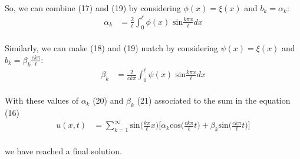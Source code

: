 \documentclass[letter]{article}
\begin{document}
    \paragraph{}So, we can combine (17) and (19) by considering $\phi(x)=\xi(x)$ and $b_k=\alpha_k$:
    \begin{equation}
        \begin{split}
            \alpha_k &= \frac{2}{\ell}\int_{0}^{\ell}\phi(x)\text{ sin}\frac{k\pi x}{\ell}dx
        \end{split}
    \end{equation}
    \paragraph{}Similarly, we can make (18) and (19) match by considering $\psi(x)=\xi(x)$ and $b_k=\beta_k\frac{ck\pi}{\ell}$:
    \begin{equation}
        \begin{split}
            \beta_k &= \frac{2}{ck\pi}\int_{0}^{\ell}\psi(x)\text{ sin}\frac{k\pi x}{\ell}dx
        \end{split}
    \end{equation}
    \paragraph{}With these values of $\alpha_k$ (20) and $\beta_k$ (21) associated to the sum in the equation (16) 
    \begin{equation*}
        \begin{split}
            u(x,t) &= 
            \sum_{k=1}^\infty\text{sin}\bigg(\frac{k\pi}{\ell}x\bigg)\bigg[\alpha_k\text{cos}\bigg(\frac{ck\pi}{\ell}t\bigg)+\beta_k\text{sin}\bigg(\frac{ck\pi}{\ell}t\bigg)\bigg]
        \end{split}
    \end{equation*}
    \paragraph{}we have reached a final solution.\\
\end{document}
